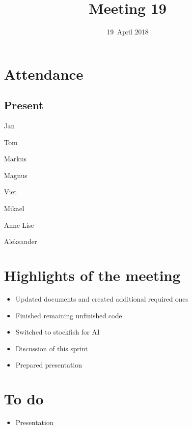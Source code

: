 \documentclass[letterpaper,11pt]{article}
\title{Meeting 19}
\date{19~April 2018}
\begin{document}
\maketitle
\section*{Attendance}
\subsection*{Present}
\begin{list}{}{}
	\item Jan
	\item Tom
	\item Markus
	\item Magnus
	\item Viet
	\item Mikael
	\item Anne Lise
	\item Aleksander
\end{list}

\newpage
\section*{Highlights of the meeting}
\begin{itemize}
	\item Updated documents and created additional required ones
	\item Finished remaining unfinished code
	\item Switched to stockfish for AI
	\item Discussion of this sprint
	\item Prepared presentation
\end{itemize}

\section*{To do}
\begin{itemize}
	\item Presentation
\end{itemize}
\end{document}
